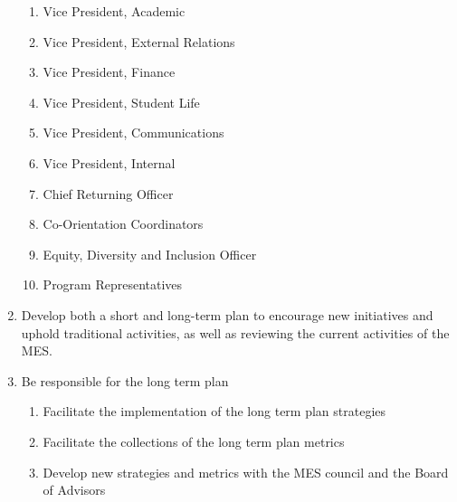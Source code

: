 \begin{enumerate}
  \begin{enumerate}
   \item
    Vice President, Academic
   \item
    Vice President, External Relations
   \item
    Vice President, Finance
   \item
    Vice President, Student Life
   \item
    Vice President, Communications
   \item
    Vice President, Internal
   \item
    Chief Returning Officer
   \item
    Co-Orientation Coordinators
   \item
    Equity, Diversity and Inclusion Officer
   \item
    Program Representatives
  \end{enumerate}
 \item
  Develop both a short and long-term plan to encourage new initiatives and uphold traditional activities, as well as reviewing the current activities of the MES.
 \item
  Be responsible for the long term plan

  \begin{enumerate}
   \item
    Facilitate the implementation of the long term plan strategies
   \item
    Facilitate the collections of the long term plan metrics
   \item
    Develop new strategies and metrics with the MES council and the Board of Advisors
  \end{enumerate}
\end{enumerate}